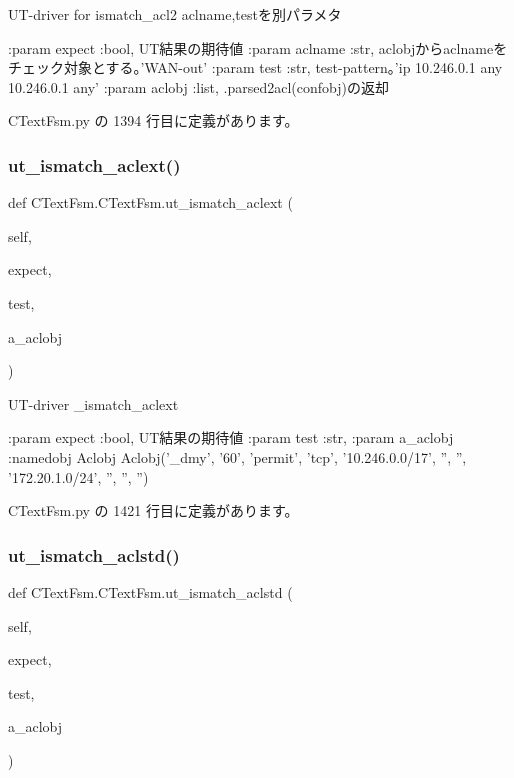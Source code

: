 \begin{DoxyVerb}UT-driver for ismatch_acl2
aclname,testを別パラメタ

:param expect  :bool, UT結果の期待値
:param aclname :str,  aclobjからaclnameをチェック対象とする。'WAN-out'
:param test    :str,  test-pattern。'ip    10.246.0.1 any 10.246.0.1 any'
:param aclobj  :list, .parsed2acl(confobj)の返却
\end{DoxyVerb}
 

 C\+Text\+Fsm.\+py の 1394 行目に定義があります。

\mbox{\label{classCTextFsm_1_1CTextFsm_ac5a745b22a0fb24ebcfc2a77bf430429}} 
\subsubsection{\texorpdfstring{ut\_ismatch\_aclext()}{ut\_ismatch\_aclext()}}
{\footnotesize\ttfamily def C\+Text\+Fsm.\+C\+Text\+Fsm.\+ut\+\_\+ismatch\+\_\+aclext (\begin{DoxyParamCaption}\item[{}]{self,  }\item[{}]{expect,  }\item[{}]{test,  }\item[{}]{a\+\_\+aclobj }\end{DoxyParamCaption})}

\begin{DoxyVerb}UT-driver _ismatch_aclext

:param expect   :bool, UT結果の期待値
:param test     :str,
:param a_aclobj :namedobj Aclobj
  Aclobj('_dmy', '60', 'permit', 'tcp', '10.246.0.0/17', '', '', '172.20.1.0/24', '', '', '')
\end{DoxyVerb}
 

 C\+Text\+Fsm.\+py の 1421 行目に定義があります。

\mbox{\label{classCTextFsm_1_1CTextFsm_a82616f58ed71035bc1b443e934692361}} 
\subsubsection{\texorpdfstring{ut\_ismatch\_aclstd()}{ut\_ismatch\_aclstd()}}
{\footnotesize\ttfamily def C\+Text\+Fsm.\+C\+Text\+Fsm.\+ut\+\_\+ismatch\+\_\+aclstd (\begin{DoxyParamCaption}\item[{}]{self,  }\item[{}]{expect,  }\item[{}]{test,  }\item[{}]{a\+\_\+aclobj }\end{DoxyParamCaption})}

